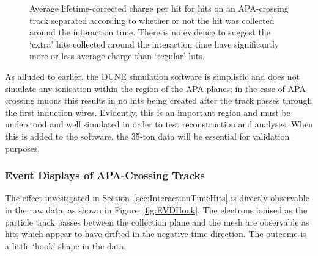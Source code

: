 \begin{figure}
\begin{subfigure}[t]{0.48\linewidth}
    \label{fig:HitChargeNonInteraction}
  \end{subfigure}
  \caption[Average lifetime-corrected charge per hit for hits on an APA-crossing track separated according to whether or not the hit was collected around the interaction time.]{Average lifetime-corrected charge per hit for hits on an APA-crossing track separated according to whether or not the hit was collected around the interaction time.  There is no evidence to suggest the `extra' hits collected around the interaction time have significantly more or less average charge than `regular' hits.}
  \label{fig:HitCharges}
\end{figure}

As alluded to earlier, the DUNE simulation software is simplistic and does not simulate any ionisation within the region of the APA planes; in the case of APA-crossing muons this results in no hits being created after the track passes through the first induction wires.  Evidently, this is an important region and must be understood and well simulated in order to test reconstruction and analyses.  When this is added to the software, the 35-ton data will be essential for validation purposes.

\subsubsection{Event Displays of APA-Crossing Tracks}\label{sec:HookEVDs}

The effect investigated in Section~\ref{sec:InteractionTimeHits} is directly observable in the raw data, as shown in Figure~\ref{fig:EVDHook}.  The electrons ionised as the particle track passes between the collection plane and the mesh are observable as hits which appear to have drifted in the negative time direction.  The outcome is a little `hook' shape in the data.

